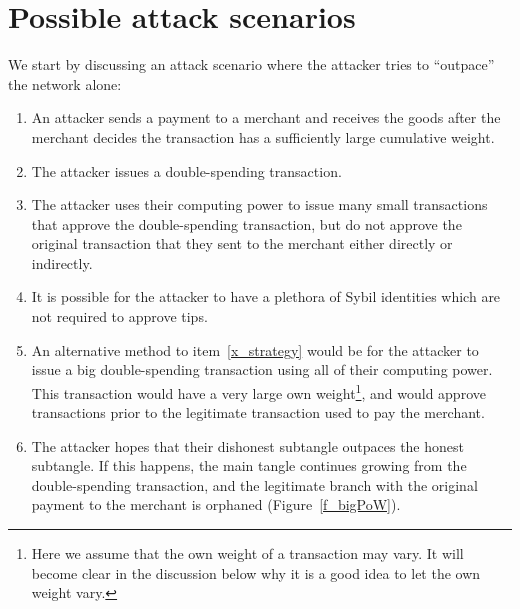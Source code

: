 \documentclass[12pt]{article}
\begin{document}
\section{Possible attack scenarios}
\label{s_attacks}
We start by discussing an 
attack scenario where the attacker tries to ``outpace'' the network alone:
\begin{enumerate}
 \item An attacker sends a payment to a merchant and receives 
 the goods after the merchant decides the transaction has a sufficiently large
  cumulative weight.
\item The attacker issues a double-spending transaction.
\item \label{x_strategy} The attacker uses their computing
 power to issue many small transactions that approve the
  double-spending transaction, but do not approve the 
  original transaction that they sent to the merchant either 
  directly or indirectly.
\item It is possible for the attacker to have a plethora of Sybil
 identities which are not required to approve tips.
\item An alternative method to item~\ref{x_strategy}
 would be for the attacker
 to issue a big double-spending transaction using all of their
  computing power. This transaction would have a very large
   own weight\footnote{Here we assume that the own weight 
   of a transaction may vary. It will become clear in the discussion
    below why it is a good idea to let the own weight vary.}, 
    and would approve transactions prior to the 
   legitimate transaction used to pay the merchant.
\item The attacker hopes that their dishonest subtangle outpaces 
the honest subtangle. If this happens, the main tangle continues 
growing from the double-spending transaction, and the legitimate 
branch with the original payment to the merchant is orphaned (Figure~\ref{f_bigPoW}).
\end{enumerate}
\end{document}
